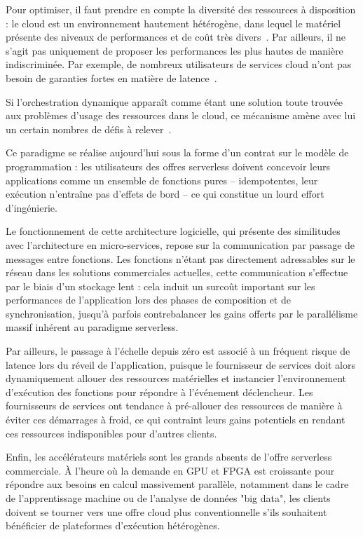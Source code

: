 Pour optimiser, il faut prendre en compte la diversité des ressources à disposition : le cloud est un environnement hautement hétérogène, dans lequel le matériel présente des niveaux de performances et de coût très divers~\cite{reissHeterogeneityDynamicityClouds}. Par ailleurs, il ne s'agit pas uniquement de proposer les performances les plus hautes de manière indiscriminée. Par exemple, de nombreux utilisateurs de services cloud n'ont pas besoin de garanties fortes en matière de latence~\cite{tirmaziBorgNextGeneration2020}.

Si l'orchestration dynamique apparaît comme étant une solution toute trouvée aux problèmes d'usage des ressources dans le cloud, ce mécanisme amène avec lui un certain nombres de défis à relever~\cite{Lannurien2023}.


Ce paradigme se réalise aujourd'hui sous la forme d'un contrat sur le modèle de programmation : les utilisateurs des offres serverless doivent concevoir leurs applications comme un ensemble de fonctions pures -- idempotentes, leur exécution n'entraîne pas d'effets de bord -- ce qui constitue un lourd effort d'ingénierie.

Le fonctionnement de cette architecture logicielle, qui présente des similitudes avec l'architecture en micro-services, repose sur la communication par passage de messages entre fonctions. Les fonctions n'étant pas directement adressables sur le réseau dans les solutions commerciales actuelles, cette communication s'effectue par le biais d'un stockage lent : cela induit un surcoût important sur les performances de l'application lors des phases de composition et de synchronisation, jusqu'à parfois contrebalancer les gains offerts par le parallélisme massif inhérent au paradigme serverless.

Par ailleurs, le passage à l'échelle depuis zéro est associé à un fréquent risque de latence lors du réveil de l'application, puisque le fournisseur de services doit alors dynamiquement allouer des ressources matérielles et instancier l'environnement d'exécution des fonctions pour répondre à l'événement déclencheur. Les fournisseurs de services ont tendance à pré-allouer des ressources de manière à éviter ces démarrages à froid, ce qui contraint leurs gains potentiels en rendant ces ressources indisponibles pour d'autres clients.

Enfin, les accélérateurs matériels sont les grands absents de l'offre serverless commerciale. À l'heure où la demande en GPU et FPGA est croissante pour répondre aux besoins en calcul massivement parallèle, notamment dans le cadre de l'apprentissage machine ou de l'analyse de données "big data", les clients doivent se tourner vers une offre cloud plus conventionnelle s'ils souhaitent bénéficier de plateformes d'exécution hétérogènes.

